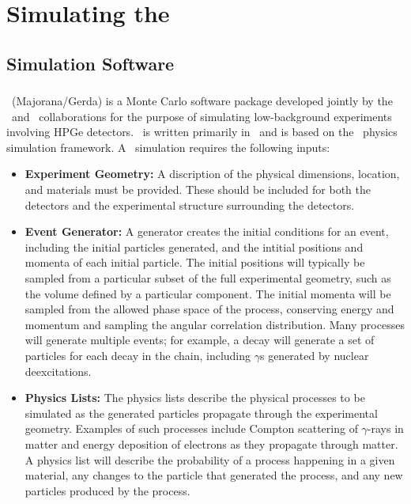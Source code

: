 \documentclass[/main.tex]{subfiles}
\begin{document}
\graphicspath{{./pics/}{ch3/pics/}}

\onlyinsubfile{\textpages}
\chapter{Simulating the \MJD}

\section{Simulation Software}
\subsection{\Mage}
\Mage\ (Majorana/Gerda) \cite{mage2011} is a Monte Carlo software package developed jointly by the \MJ\ and \Gerda\ collaborations for the purpose of simulating low-background experiments involving HPGe detectors.
\Mage\ is written primarily in \cpp\ and is based on the \geant\ physics simulation framework\cite{geant2003}.
A \geant\ simulation requires the following inputs:
\begin{itemize}
\item{\textbf{Experiment Geometry:}}
  A discription of the physical dimensions, location, and materials must be provided.
  These should be included for both the detectors and the experimental structure surrounding the detectors.
\item{\textbf{Event Generator:}}
  A generator creates the initial conditions for an event, including the initial particles generated, and the intitial positions and momenta of each initial particle.
  The initial positions will typically be sampled from a particular subset of the full experimental geometry, such as the volume defined by a particular component.
  The initial momenta will be sampled from the allowed phase space of the process, conserving energy and momentum and sampling the angular correlation distribution.
  Many processes will generate multiple events; for example, a  decay will generate a set of particles for each decay in the chain, including $\gamma$s generated by nuclear deexcitations.
\item{\textbf{Physics Lists:}}
  The physics lists describe the physical processes to be simulated as the generated particles propagate through the experimental geometry.
  Examples of such processes include Compton scattering of $\gamma$-rays in matter and energy deposition of electrons as they propagate through matter.
  A physics list will describe the probability of a process happening in a given material, any changes to the particle that generated the process, and any new particles produced by the process.
\end{itemize}
\end{document}
